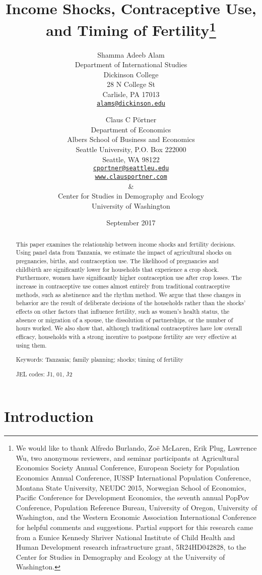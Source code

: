\documentclass[letterpaper,12pt]{article}
\title{Income Shocks, Contraceptive Use,\\ and Timing of Fertility\thanks{%
We would like to thank 
Alfredo Burlando,
Zo\"e McLaren, 
Erik Plug,
Lawrence Wu, 
two anonymous reviewers, 
and seminar participants at 
Agricultural Economics Society Annual Conference,
European Society for Population Economics Annual Conference,
IUSSP International Population Conference,
Montana State University, 
NEUDC 2015,
Norwegian School of Economics, 
Pacific Conference for Development Economics, 
the seventh annual PopPov Conference, 
Population Reference Bureau,
University of Oregon,
University of Washington,
and the 
Western Economic Association International Conference
for helpful comments and suggestions.
Partial support for this research came from a Eunice Kennedy Shriver National
Institute of Child Health and Human Development research infrastructure grant,
5R24HD042828, to the Center for Studies in Demography and Ecology at the
University of Washington.
}}
\author{Shamma Adeeb Alam\\
	Department of International Studies\\
	Dickinson College\\
	28 N College St\\
	Carlisle, PA 17013\\
	\href{mailto:alams@dickinson.edu}{\texttt{alams@dickinson.edu}}\\
\and
	Claus C P\"ortner\\
    Department of Economics\\
    Albers School of Business and Economics\\
    Seattle University, P.O. Box 222000\\
    Seattle, WA 98122\\
    \href{mailto:cportner@seattleu.edu}{\texttt{cportner@seattleu.edu}}\\
    \href{http://www.clausportner.com}{\texttt{www.clausportner.com}}\\
    \& \\
    Center for Studies in Demography and Ecology \\
    University of Washington\\ 
    }
\date{September 2017}
\begin{document}
\def\sym#1{\ifmmode^{#1}\else\(^{#1}\)\fi}

\setcounter{page}{0}
\maketitle
\thispagestyle{empty}

\newpage
\setcounter{page}{0}
\thispagestyle{empty}

\doublespacing


\begin{abstract} 
\noindent This paper examines the relationship between income 
shocks and fertility decisions. 
Using panel data from Tanzania, we estimate the impact of agricultural shocks 
on 
pregnancies, 
births, 
and 
contraception use.
The likelihood of 
pregnancies and childbirth are significantly lower for households that experience
a crop shock.
Furthermore, women have significantly higher contraception use after 
crop losses. 
The increase in contraceptive use comes almost entirely from traditional 
contraceptive methods, such as abstinence and the rhythm method.
We argue that these changes in behavior are the result of deliberate decisions of
the households rather than the shocks' effects on other factors that influence
fertility, such as women's health status, the absence or migration of a spouse, 
the dissolution of partnerships, or the number of hours worked. 
We also show that, although traditional contraceptives have low overall
efficacy, households with a strong incentive to postpone fertility
are very effective at using them.

\noindent Keywords: Tanzania; family planning; shocks; timing of fertility

\noindent JEL codes: J1, 01, J2
\end{abstract}

\newpage


\section{Introduction}
\end{document}
